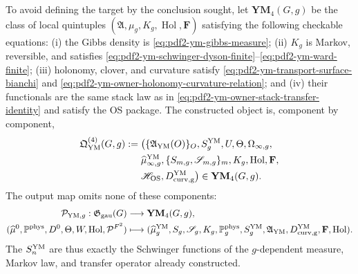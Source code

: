 To avoid defining the target by the conclusion sought, let
$\mathbf{YM}_4(G,g)$ be the class of local quintuples
$(\mathfrak A,\mu_g,K_g,\operatorname{Hol},\mathbf F)$ satisfying the following
checkable equations: (i) the Gibbs density is
\eqref{eq:pdf2-ym-gibbs-measure}; (ii) $K_g$ is Markov, reversible, and satisfies
\eqref{eq:pdf2-ym-schwinger-dyson-finite}--\eqref{eq:pdf2-ym-ward-finite};
(iii) holonomy, clover, and curvature satisfy
\eqref{eq:pdf2-ym-transport-surface-bianchi} and
\eqref{eq:pdf2-ym-owner-holonomy-curvature-relation}; and (iv) their functionals are the
same stack law as in \eqref{eq:pdf2-ym-owner-stack-transfer-identity} and satisfy the
OS package\@. The constructed object is, component by component,
\begin{equation}\label{eq:pdf2-ym-owner-qym-object}
\begin{aligned}
 \mathfrak Q_{\rm YM}^{(4)}(G,g):={}&
 \bigl(\{\mathfrak A_{\rm YM}(O)\}_O,
 S_g^{\rm YM},U,\Theta,\Omega_{\infty,g},\\
 &\widehat\mu_{\infty,g}^{\rm YM},
 \{S_{m,g},\mathscr S_{m,g}\}_m,K_g,
 \operatorname{Hol},\mathbf F,\\
 &\mathscr H_{\rm OS},D_{\rm curv,g}^{\rm YM}\bigr)
 \in\mathbf{YM}_4(G,g).
\end{aligned}
\end{equation}
The output map omits none of these components:
\begin{equation}\label{eq:pdf2-ym-owner-typed-publication-map}
 \begin{aligned}
 \mathcal P_{{\rm YM},g}:\mathfrak G_{\rm gau}(G)&\longrightarrow
 \mathbf{YM}_4(G,g),\\
 (\widehat\mu^0,\mathbb P^{\rm phys},D^0,\Theta,W,
   \operatorname{Hol},\mathcal P^{F^2})
 &\longmapsto
 (\widehat\mu_g^{\rm YM},S_g,\mathscr S_g,K_g,\mathbb P_g^{\rm phys},
  S_g^{\rm YM},\mathfrak A_{\rm YM},D_{\rm curv,g}^{\rm YM},
  \mathbf F,\operatorname{Hol}).
 \end{aligned}
\end{equation}
The $S_n^{\rm YM}$ are thus exactly the Schwinger functions of the
$g$-dependent measure, Markov law, and transfer operator already constructed.

